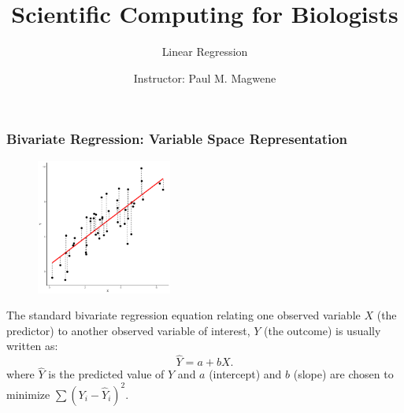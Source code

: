 \documentclass{beamer}
\title{Scientific Computing for Biologists}
\subtitle{Linear Regression} %
\date{}
\author[P. Magwene]{Instructor: Paul M. Magwene}
\begin{document}
\begin{frame}
\titlepage
\end{frame}


\begin{frame}
  \frametitle{Bivariate Regression: Variable Space Representation}

\begin{figure}
{\centering \includegraphics[height=1.75in]{bivariate-regression-image.pdf}}
\end{figure}

\smallskip

The standard bivariate regression equation relating one observed variable $X$ (the predictor) to another observed variable of interest, $Y$ (the outcome) is usually written as:
\[
\widehat{Y} = a + bX.
\]
where $\widehat{Y}$ is the predicted value of $Y$ and $a$ (intercept) and $b$ (slope) are  chosen to minimize $\sum (Y_i - \hat{Y}_i)^2$.


\end{frame}
\end{document}
